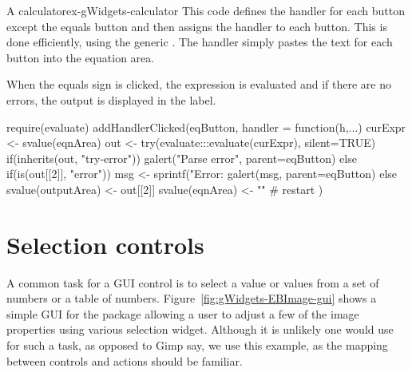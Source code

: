 \begin{example}{A calculator}{ex-gWidgets-calculator}
This code defines the handler for each button except the equals button
and then assigns the handler to each button. This is done efficiently,
using the generic . The handler simply pastes
the text for each button into the equation area.

\begin{Schunk}
\end{Schunk}

When the equals sign is clicked, the expression is evaluated and if
there are no errors, the output is displayed in the
label.
\begin{Schunk}
\begin{Sinput}
 require(evaluate)
 addHandlerClicked(eqButton, handler = function(h,...) {
   curExpr <- svalue(eqnArea)
   out <- try(evaluate:::evaluate(curExpr), silent=TRUE)
   if(inherits(out, "try-error")) {
     galert("Parse error", parent=eqButton)
   } else if(is(out[[2]], "error")) {
     msg <- sprintf("Error: %
     galert(msg, parent=eqButton)
   } else {
     svalue(outputArea) <- out[[2]]
     svalue(eqnArea) <- ""            # restart
   }
 })
                   
\end{Sinput}
\end{Schunk}

\end{example}

\section{Selection controls}
\label{sec:gWidgets-widg-select-data}

A common task for a GUI control is to select a value or values from a
set of numbers or a table of
numbers. Figure~\ref{fig:gWidgets-EBImage-gui} shows a simple GUI for
the  package allowing a user to adjust a few of the image
properties using various selection widget. Although it is unlikely one
would use \R{} for such a task, as opposed to Gimp say, we use this
example, as the mapping between controls and actions should be
familiar.

